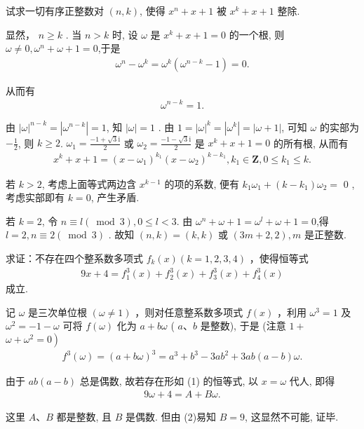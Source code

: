 \begin{example}
	试求一切有序正整数对 $(n, k)$, 使得 $x^n+x+1$ 被 $x^k+x+1$ 整除.
\end{example}
\begin{solution}
	显然， $n \geqslant k$ .
	当 $n>k$ 时, 设 $\omega$ 是 $x^k+x+1=0$ 的一个根, 则 $\omega \neq 0, \omega^n+\omega+1=0$,于是
	\begin{align*}
		\omega^n-\omega^k=\omega^k\left(\omega^{n-k}-1\right)=0 .
	\end{align*}

	从而有
	\begin{align*}
		\omega^{n-k}=1 .
	\end{align*}

	由 $|\omega|^{n-k}=\left|\omega^{n-k}\right|=1$, 知 $|\omega|=1$ .
	由 $1=|\omega|^k=\left|\omega^k\right|=|\omega+1|$, 可知 $\omega$ 的实部为 $-\frac{1}{2}$, 则 $k \geqslant 2$.
	$\omega_1=\frac{-1+\sqrt{3} \mathrm{i}}{2}$ 或 $\omega_2=\frac{-1-\sqrt{3} \mathrm{i}}{2}$ 是 $x^k+x+1=0$ 的所有根, 从而有
	\begin{align*}
		x^k+x+1=\left(x-\omega_1\right)^{k_1}\left(x-\omega_2\right)^{k-k_1}, k_1 \in \mathbf{Z}, 0 \leqslant k_1 \leqslant k .
	\end{align*}

	若 $k>2$, 考虑上面等式两边含 $x^{k-1}$ 的项的系数, 便有 $k_1 \omega_1+\left(k-k_1\right) \omega_2=$ 0 , 考虑实部即有 $k=0$, 产生矛盾.

	若 $k=2$, 令 $n \equiv l(\bmod 3), 0 \leqslant l<3$. 由 $\omega^n+\omega+1=\omega^l+\omega+1=0$,得 $l=2, n \equiv 2(\bmod 3)$ .
	故知 $(n, k)=(k, k)$ 或 $(3 m+2,2), m$ 是正整数.
\end{solution}

\begin{example}
	求证：不存在四个整系数多项式 $f_k(x)(k=1,2,3,4)$ ，使得恒等式
	\begin{align*}
		9 x+4=f_1^3(x)+f_2^3(x)+f_3^3(x)+f_4^3(x)
	\end{align*}
	成立.
\end{example}
\begin{solution}
	记 $\omega$ 是三次单位根 $(\omega \neq 1)$ ，则对任意整系数多项式 $f(x)$ ，利用 $\omega^3=1$ 及 $\omega^2=-1-\omega$ 可将 $f(\omega)$ 化为 $a+b \omega$ ( $a 、 b$ 是整数), 于是 (注意 $1+$ $\left.\omega+\omega^2=0\right)$
	\begin{align*}
		f^3(\omega)=(a+b \omega)^3=a^3+b^3-3 a b^2+3 a b(a-b) \omega .
	\end{align*}

	由于 $a b(a-b)$ 总是偶数, 故若存在形如 (1) 的恒等式, 以 $x=\omega$ 代人, 即得
	\begin{align*}
		9 \omega+4=A+B \omega .
	\end{align*}

	这里 $A 、 B$ 都是整数, 且 $B$ 是偶数. 但由 (2)易知 $B=9$, 这显然不可能, 证毕.
\end{solution}


